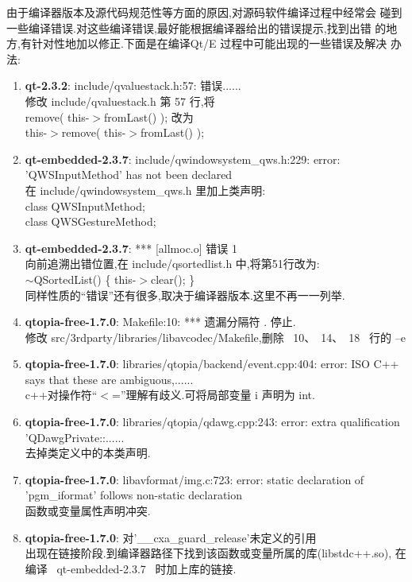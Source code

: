 	由于编译器版本及源代码规范性等方面的原因,对源码软件编译过程中经常会
碰到一些编译错误.对这些编译错误,最好能根据编译器给出的错误提示,找到出错
的地方,有针对性地加以修正.下面是在编译Qt/E 过程中可能出现的一些错误及解决
办法:
\begin{enumerate}\itemsep=-3pt
  \item {\bf qt-2.3.2}: include/qvaluestack.h:57: 错误......\\
		修改 include/qvaluestack.h 第 57 行,将\\
		remove( this-$>$fromLast() ); 改为\\
		this-$>$remove( this-$>$fromLast() );
  \item {\bf qt-embedded-2.3.7}: include/qwindowsystem\_qws.h:229: error:
		'QWSInputMethod' has not been declared\\
		在 include/qwindowsystem\_qws.h 里加上类声明:\\
		class   QWSInputMethod;\\
		class   QWSGestureMethod;
  \item {\bf qt-embedded-2.3.7}: *** [allmoc.o] 错误 1\\
		向前追溯出错位置,在 include/qsortedlist.h 中,将第51行改为:\\
		$\sim$QSortedList() \{ this-$>$clear(); \}\\
		同样性质的``错误''还有很多,取决于编译器版本.这里不再一一列举.
  \item {\bf qtopia-free-1.7.0}: Makefile:10: *** 遗漏分隔符 . 停止.\\
		修改 src/3rdparty/libraries/libavcodec/Makefile,删除 ~10、~14、~18~
		行的 --e
  \item {\bf qtopia-free-1.7.0}: libraries/qtopia/backend/event.cpp:404:
		error: ISO C++ says that these are ambiguous,......\\
		c++对操作符``$<$=''理解有歧义.可将局部变量 i 声明为 int.
  \item {\bf qtopia-free-1.7.0}: libraries/qtopia/qdawg.cpp:243: error:
		extra qualification 'QDawgPrivate::......\\
		去掉类定义中的本类声明.
  \item {\bf qtopia-free-1.7.0}: libavformat/img.c:723: error: static
		declaration of 'pgm\_iformat' follows non-static declaration\\
		函数或变量属性声明冲突.
  \item {\bf qtopia-free-1.7.0}: 对'\_\_cxa\_guard\_release'未定义的引用\\
		出现在链接阶段.到编译器路径下找到该函数或变量所属的库(libstdc++.so),
		在编译 ~qt-embedded-2.3.7~ 时加上库的链接.
\end{enumerate}
\rm\normalsize
